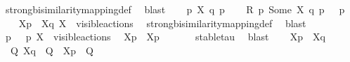 \begin{isabellebody}
\ strong{\isacharunderscore}{\kern0pt}bisimilarity{\isacharunderscore}{\kern0pt}mapping{\isacharunderscore}{\kern0pt}def\ \isamarkupfalse%
\ blast\isanewline
{}\isamarkupfalse%
\isanewline
\ \ \isamarkupfalse%
\ p\ X\ q\ p{\isacharprime}{\kern0pt}\isanewline
\ \ \isamarkupfalse%
\ {\isacartoucheopen}{\isacharquery}{\kern0pt}R\ p\ {\isacharparenleft}{\kern0pt}Some\ X{\isacharparenright}{\kern0pt}\ q{\isacartoucheclose}\ {\isacartoucheopen}p\ {\isasymlongmapsto}{\isasymtau}\ \ p{\isacharprime}{\kern0pt}{\isacartoucheclose}\isanewline
\ \ \isamarkupfalse%
\ {\isacartoucheopen}{\isasymtheta}{\isacharbrackleft}{\kern0pt}X{\isacharbrackright}{\kern0pt}{\isacharparenleft}{\kern0pt}p{\isacharparenright}{\kern0pt}\ {\isasymleftrightarrow}\ {\isasymtheta}{\isacharbrackleft}{\kern0pt}X{\isacharbrackright}{\kern0pt}{\isacharparenleft}{\kern0pt}q{\isacharparenright}{\kern0pt}{\isacartoucheclose}\ {\isacartoucheopen}X\ {\isasymsubseteq}\ visible{\isacharunderscore}{\kern0pt}actions{\isacartoucheclose}\ \isamarkupfalse%
\ strong{\isacharunderscore}{\kern0pt}bisimilarity{\isacharunderscore}{\kern0pt}mapping{\isacharunderscore}{\kern0pt}def\ \isamarkupfalse%
\ blast{\isacharplus}{\kern0pt}\isanewline
\ \ \isamarkupfalse%
\ {\isacartoucheopen}p\ {\isasymlongmapsto}{\isasymtau}\ \ p{\isacharprime}{\kern0pt}{\isacartoucheclose}\ {\isacartoucheopen}X\ {\isasymsubseteq}\ visible{\isacharunderscore}{\kern0pt}actions{\isacartoucheclose}\ \isamarkupfalse%
\ {\isacartoucheopen}{\isasymtheta}{\isacharbrackleft}{\kern0pt}X{\isacharbrackright}{\kern0pt}{\isacharparenleft}{\kern0pt}p{\isacharparenright}{\kern0pt}\ {\isasymlongmapsto}\isactrlsup {\isasymtheta}{\isasymtau}\ {\isasymtheta}{\isacharbrackleft}{\kern0pt}X{\isacharbrackright}{\kern0pt}{\isacharparenleft}{\kern0pt}p{\isacharprime}{\kern0pt}{\isacharparenright}{\kern0pt}{\isacartoucheclose}\ \isanewline
\ \ \ \ \isamarkupfalse%
\ stable{\isacharunderscore}{\kern0pt}tau\ \isamarkupfalse%
\ blast\isanewline
\ \ \isamarkupfalse%
\ {\isacartoucheopen}{\isasymtheta}{\isacharbrackleft}{\kern0pt}X{\isacharbrackright}{\kern0pt}{\isacharparenleft}{\kern0pt}p{\isacharparenright}{\kern0pt}\ {\isasymleftrightarrow}\ {\isasymtheta}{\isacharbrackleft}{\kern0pt}X{\isacharbrackright}{\kern0pt}{\isacharparenleft}{\kern0pt}q{\isacharparenright}{\kern0pt}{\isacartoucheclose}\ \isamarkupfalse%
\ {\isacartoucheopen}{\isasymexists}\ Q{\isacharprime}{\kern0pt}{\isachardot}{\kern0pt}\ {\isasymtheta}{\isacharbrackleft}{\kern0pt}X{\isacharbrackright}{\kern0pt}{\isacharparenleft}{\kern0pt}q{\isacharparenright}{\kern0pt}\ {\isasymlongmapsto}\isactrlsup {\isasymtheta}{\isasymtau}\ Q{\isacharprime}{\kern0pt}\ {\isasymand}\ {\isasymtheta}{\isacharbrackleft}{\kern0pt}X{\isacharbrackright}{\kern0pt}{\isacharparenleft}{\kern0pt}p{\isacharprime}{\kern0pt}{\isacharparenright}{\kern0pt}\ {\isasymleftrightarrow}\ Q{\isacharprime}{\kern0pt}{\isacartoucheclose}\isanewline

\end{isabellebody}
